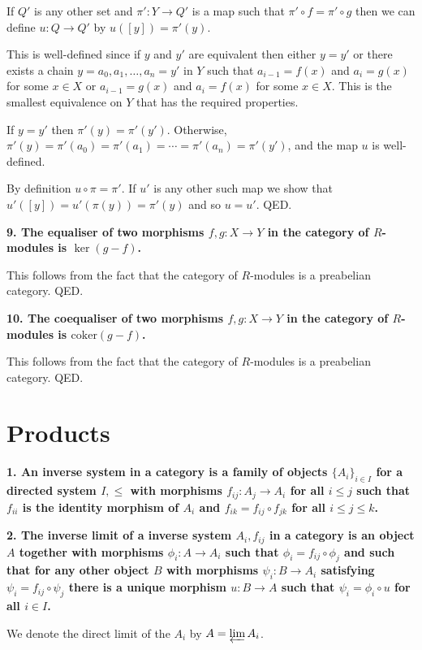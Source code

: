 \documentclass[12pt]{article}
\begin{document}
If $Q'$ is any other set and $\pi' : Y \to Q'$ is a map such that $\pi'\circ f = \pi'\circ g$ then we can define $u : Q \to Q'$ by $u([y]) = \pi'(y)$. 

This is well-defined since if $y$ and $y'$ are equivalent then either $y = y'$ or there exists a chain $y = a_0, a_1, \ldots, a_n = y'$ in $Y$ such that $a_{i-1} = f(x)$ and $a_i = g(x)$ for some $x \in X$ or $a_{i-1} = g(x)$ and $a_i = f(x)$ for some $x \in X$. This is the smallest equivalence on $Y$ that has the required properties.

If $y = y'$ then $\pi'(y) = \pi'(y')$. Otherwise, $\pi'(y) = \pi'(a_0) = \pi'(a_1) = \cdots = \pi'(a_n) = \pi'(y')$, and the map $u$ is well-defined.

By definition $u\circ \pi = \pi'$. If $u'$ is any other such map we show that $u'([y]) = u'(\pi(y)) = \pi'(y)$ and so $u = u'$. QED.

\textbf{9. The equaliser of two morphisms $f, g : X \to Y$ in the category of $R$-modules is $\ker(g - f)$.}

This follows from the fact that the category of $R$-modules is a preabelian category. QED.

\textbf{10. The coequaliser of two morphisms $f, g : X \to Y$ in the category of $R$-modules is $\mbox{coker}(g - f)$.}

This follows from the fact that the category of $R$-modules is a preabelian category. QED.

\section{Products}

\textbf{1. An inverse system in a category is a family of objects $\{A_i\}_{i \in I}$ for a directed system $I, \leq$ with morphisms $f_{ij} : A_j \to A_i$ for all $i \leq j$ such that $f_{ii}$ is the identity morphism of $A_i$ and $f_{ik} = f_{ij}\circ f_{jk}$ for all $i \leq j \leq k$.}

\textbf{2. The inverse limit of a inverse system $A_i, f_{ij}$ in a category is an object $A$ together with morphisms $\phi_i : A \to A_i$ such that $\phi_i = f_{ij}\circ \phi_j$ and such that for any other object $B$ with morphisms $\psi_i : B\to A_i$ satisfying $\psi_i = f_{ij}\circ \psi_j$ there is a unique morphism $u : B \to A$ such that $\psi_i = \phi_i \circ u$ for all $i \in I$.}

We denote the direct limit of the $A_i$ by $A = \varprojlim A_i$.
\end{document}
